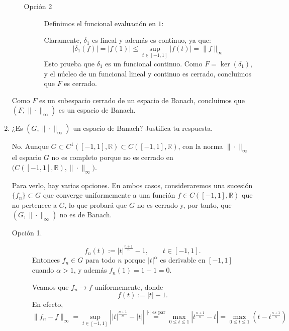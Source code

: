 \documentclass[12pt]{article}
\begin{document}
\begin{ejercicio}[3 puntos]
\begin{enumerate}[label=\alph*)]
\begin{itemize}
\begin{description}
                    \item[Opción 2]
                        Definimos el funcional evaluación en $1$:

                        Claramente, $\delta_1$ es lineal y además es continuo, ya que:
                        \[
                        |\delta_1(f)| = |f(1)| \leq \sup_{t\in[-1,1]}|f(t)| = \|f\|_\infty
                        \]
                        Esto prueba que $\delta_1$ es un funcional continuo. Como $F = \ker(\delta_1)$, y el núcleo de un funcional lineal y continuo es cerrado, concluimos que $F$ es cerrado.
                \end{description}
            \end{itemize}
            
            Como $F$ es un subespacio cerrado de un espacio de Banach,
            concluimos que $(F,\|\cdot\|_\infty)$ es un espacio de Banach.
            
            \item ¿Es $(G,\|\cdot \|_\infty)$ un espacio de Banach? Justifica tu respuesta.

            \noindent
            No. Aunque $G\subset C^1([-1,1],\mathbb{R})\subset C([-1,1],\mathbb{R})$, con la norma
            $\|\cdot\|_\infty$ el espacio $G$ no es completo porque no es cerrado en
            $\big(C([-1,1],\mathbb{R}),\|\cdot\|_\infty\big)$.
            
            \medskip
            
            \noindent
            Para verlo, hay varias opciones. En ambos casos, consideraremos una sucesión $\{f_n\}\subset G$ que converge uniformemente a una función $f\in C([-1,1],\mathbb{R})$ que no pertenece a $G$, lo que probará que $G$ no es cerrado y, por tanto, que $(G,\|\cdot\|_\infty)$ no es de Banach.
            \begin{description}
            \item[Opción 1.] 
            \[
            f_n(t):=|t|^{\frac{n+1}{n}}-1,\qquad t\in[-1,1].
            \]
            Entonces $f_n\in G$ para todo $n$ porque $|t|^{\alpha}$ es derivable en $[-1,1]$ cuando
            $\alpha>1$, y además $f_n(1)=1-1=0$.
            
            \medskip
            
            \noindent
            Veamos que $f_n\to f$ uniformemente, donde
            \[
            f(t):=|t|-1.
            \]
            En efecto,
            \[
            \|f_n-f\|_\infty
            =\sup_{t\in[-1,1]}\left||t|^{\frac{n+1}{n}}-|t|\right|
            \overset{|\cdot| \text{ es par}}{=}\max_{0\le t\le 1}\left|t^{\frac{n+1}{n}}-t\right|
            = \max_{0\le t\le 1}\left(t-t^{\frac{n+1}{n}}\right)
            \]
            

\end{description}
\end{enumerate}
\end{ejercicio}
\end{document}
